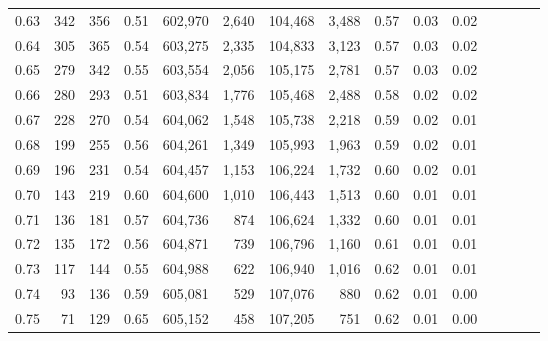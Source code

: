 \begin{tabular}{rrrcrrrrrrrrrrr}
0.63 &     342 &    356 &                                       0.51 &  602,970 &    2,640 &  104,468 &    3,488 &  0.57 &  0.03 &                         0.02 \\
0.64 &     305 &    365 &                                       0.54 &  603,275 &    2,335 &  104,833 &    3,123 &  0.57 &  0.03 &                         0.02 \\
0.65 &     279 &    342 &                                       0.55 &  603,554 &    2,056 &  105,175 &    2,781 &  0.57 &  0.03 &                         0.02 \\
0.66 &     280 &    293 &                                       0.51 &  603,834 &    1,776 &  105,468 &    2,488 &  0.58 &  0.02 &                         0.02 \\
0.67 &     228 &    270 &                                       0.54 &  604,062 &    1,548 &  105,738 &    2,218 &  0.59 &  0.02 &                         0.01 \\
0.68 &     199 &    255 &                                       0.56 &  604,261 &    1,349 &  105,993 &    1,963 &  0.59 &  0.02 &                         0.01 \\
0.69 &     196 &    231 &                                       0.54 &  604,457 &    1,153 &  106,224 &    1,732 &  0.60 &  0.02 &                         0.01 \\
0.70 &     143 &    219 &                                       0.60 &  604,600 &    1,010 &  106,443 &    1,513 &  0.60 &  0.01 &                         0.01 \\
0.71 &     136 &    181 &                                       0.57 &  604,736 &      874 &  106,624 &    1,332 &  0.60 &  0.01 &                         0.01 \\
0.72 &     135 &    172 &                                       0.56 &  604,871 &      739 &  106,796 &    1,160 &  0.61 &  0.01 &                         0.01 \\
0.73 &     117 &    144 &                                       0.55 &  604,988 &      622 &  106,940 &    1,016 &  0.62 &  0.01 &                         0.01 \\
0.74 &      93 &    136 &                                       0.59 &  605,081 &      529 &  107,076 &      880 &  0.62 &  0.01 &                         0.00 \\
0.75 &      71 &    129 &                                       0.65 &  605,152 &      458 &  107,205 &      751 &  0.62 &  0.01 &                         0.00 \\

\end{tabular}
